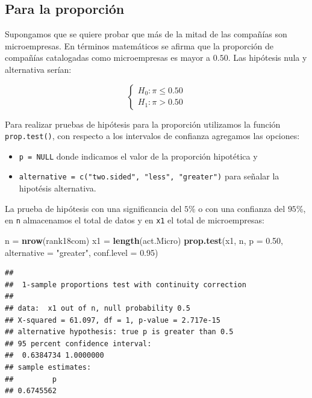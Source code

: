 \documentclass[letterpaper,]{book}
\newenvironment{Shaded}{\begin{snugshade}}{\end{snugshade}}
\newcommand{\DataTypeTok}[1]{\textcolor[rgb]{0.13,0.29,0.53}{#1}}
\newcommand{\FloatTok}[1]{\textcolor[rgb]{0.00,0.00,0.81}{#1}}
\newcommand{\KeywordTok}[1]{\textcolor[rgb]{0.13,0.29,0.53}{\textbf{#1}}}
\newcommand{\NormalTok}[1]{#1}
\newcommand{\StringTok}[1]{\textcolor[rgb]{0.31,0.60,0.02}{#1}}
\providecommand{\tightlist}{%
  \setlength{\itemsep}{0pt}\setlength{\parskip}{0pt}}
\begin{document}
\hypertarget{para-la-proporcion-1}{%
\subsection{Para la proporción}\label{para-la-proporcion-1}}

Supongamos que se quiere probar que más de la mitad de las compañías son microempresas. En términos matemáticos se afirma que la proporción de compañías catalogadas como microempresas es mayor a \(0.50\). Las hipótesis nula y alternativa serían:

\begin{equation} 
\begin{cases} 
H_0: \pi \leq 0.50 \\ 
H_1: \pi > 0.50
\end{cases} 
\end{equation}

Para realizar pruebas de hipótesis para la proporción utilizamos la función \texttt{prop.test()}, con respecto a los intervalos de confianza agregamos las opciones:

\begin{itemize}
\tightlist
\item
  \texttt{p\ =\ NULL} donde indicamos el valor de la proporción hipotética y
\item
  \texttt{alternative\ =\ c("two.sided",\ "less",\ "greater")} para señalar la hipotésis alternativa.
\end{itemize}

La prueba de hipótesis con una significancia del \(5\%\) o con una confianza del \(95\)\%, en \texttt{n} almacenamos el total de datos y en \texttt{x1} el total de microempresas:

\begin{Shaded}
\begin{Highlighting}[]
\NormalTok{n =}\StringTok{ }\KeywordTok{nrow}\NormalTok{(rank18com)}
\NormalTok{x1 =}\StringTok{ }\KeywordTok{length}\NormalTok{(act.Micro)}
\KeywordTok{prop.test}\NormalTok{(x1, n, }\DataTypeTok{p =} \FloatTok{0.50}\NormalTok{, }\DataTypeTok{alternative =} \StringTok{"greater"}\NormalTok{,  }\DataTypeTok{conf.level =} \FloatTok{0.95}\NormalTok{)}
\end{Highlighting}
\end{Shaded}

\begin{verbatim}
## 
##  1-sample proportions test with continuity correction
## 
## data:  x1 out of n, null probability 0.5
## X-squared = 61.097, df = 1, p-value = 2.717e-15
## alternative hypothesis: true p is greater than 0.5
## 95 percent confidence interval:
##  0.6384734 1.0000000
## sample estimates:
##         p 
## 0.6745562
\end{verbatim}
\end{document}
